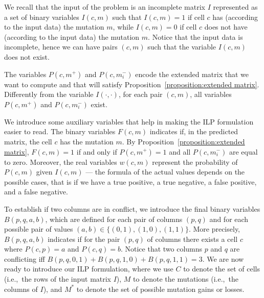 \documentclass[a4paper,USenglish]{article}
\newcommand{\ie}{i.e.,~}
\theoremstyle{definition}
\begin{document}
We recall that the input of the problem is an incomplete matrix $I$ represented as a set
of binary variables $I(c,m)$ such that $I(c,m)=1$ if cell 
$c$ has (according to the input data) the mutation $m$, while $I(c,m)=0$ if cell
$c$ does not have (according to the input data) the mutation $m$.
%
Notice that the input data is incomplete, hence we can have pairs $(c,m)$ such that
the variable $I(c,m)$ does not exist.


The variables $P(c,m^{+})$ and $P(c,m_{i}^{-})$ encode the extended matrix that we want to compute and
that will satisfy Proposition~\ref{proposition:extended matrix}.
Differently from the variable $I(\cdot,\cdot)$, for each pair $(c,m)$, all
variables $P(c,m^{+})$ and $P(c,m_{i}^{-})$ exist.

We introduce some auxiliary variables that help in making the ILP formulation easier to read.
The binary variables $F(c,m)$ indicates if, in the predicted matrix, the cell $c$ has the
mutation $m$.
By Proposition~\ref{proposition:extended matrix}, $F(c,m)=1$ if and only if $P(c,m^{+})=1$
and all $P(c,m_{i}^{-})$ are equal to zero.
Moreover, the real variables $w(c,m)$ represent the probability of $P(c,m)$ given $I(c,m)$
--- the formula of the actual values depends on the possible cases, that is if we have a
true positive, a true negative, a false positive, and a false negative.


To establish if two columns are in conflict, we introduce the final binary variables 
$B(p,q,a,b)$, which  are defined for each pair of columns $(p,q)$ and for each
possible  pair  of  values  $(a,b)\in \{(0,1), (1,0), (1,1)\}$.
More precisely, $B(p,q,a,b)$ indicates if for the pair  $(p,q)$ of columns
there  exists a cell $c$ where $P(c,p)=a$ and $P(c,q)=b$.
Notice that two columns $p$ and $q$ are conflicting iff $B(p,q,0,1) + B(p,q,1,0) +
B(p,q,1,1) = 3$.
We are now ready to introduce our ILP formulation, where we use $C$ to denote the set of
cells (\ie the rows of the input matrix $I$), $M$ to denote the mutations (\ie the columns
of $I$), and $M^{*}$ to denote the set of possible mutation gains or losses.
\end{document}
